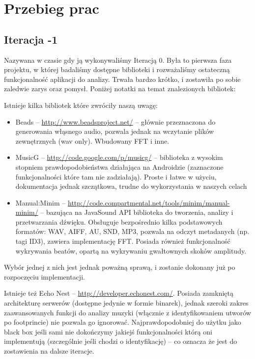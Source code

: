 \chapter{Przebieg prac}

\section{Iteracja -1}
Nazywana w czasie gdy ją wykonywaliśmy Iteracją 0. Była to pierwsza faza projektu, w której badaliśmy dostępne biblioteki i rozważaliśmy ostateczną funkcjonalność aplikacji do analizy. Trwała bardzo krótko, i zostawiła po sobie zaledwie zarys oraz pomysł. Poniżej notatki na temat znalezionych bibliotek:

\begin{Note}

Istnieje kilka bibliotek które zwróciły naszą uwagę:

\begin{itemize}
  \item Beads -- \url{http://www.beadsproject.net/} -- głównie przeznaczona do generowania włąsnego audio, pozwala jednak na wczytanie plików zewnętrznych (wav only). Wbudowany FFT i inne.
  \item MusicG -- \url{http://code.google.com/p/musicg/} -- biblioteka z wysokim stopniem prawdopodobieństwa działająca na Androidzie (zaznaczone funkcjonalności które tam nie zadziałają). Proste i łatwe w użyciu, dokumentacja jednak szczątkowa, trudne do wykorzystania w naszych celach
  \item Manual:Minim -- \url{http://code.compartmental.net/tools/minim/manual-minim/} -- bazująca na JavaSound API biblioteka do tworzenia, analizy i przetwarzania dźwięku. Obsługuje bezpośrednio kilka podstawowych formatów: WAV, AIFF, AU, SND, MP3, pozwala na odczyt metadanych (np. tagi ID3), zawiera implementację FFT. Posiada również funkcjonalność wykrywania beatów, opartą na wykrywaniu gwałtownych skoków amplitudy.
\end{itemize}

Wybór jednej z nich jest jednak poważną sprawą, i zostanie dokonany już po rozpoczęciu implementacji.

Istnieje też Echo Nest -- \url{http://developer.echonest.com/}. Posiada zamkniętą architekturę
serwerów (dostępne jedynie w formie binarek), jednak szeroki zakres zaawansowanych funkcji do
analizy muzyki (włącznie z identyfikowaniem utworów po footprincie) nie pozwala go ignorować.
Najprawdopodobniej do użytku jako black box jeśli sami nie dokończymy jakiejś funkcjonalności którą
oni implementują (szczególnie jeśli chodzi o identyfikację) -- co oznacza że jest do zostawienia na dalsze iteracje.

\end{Note}

